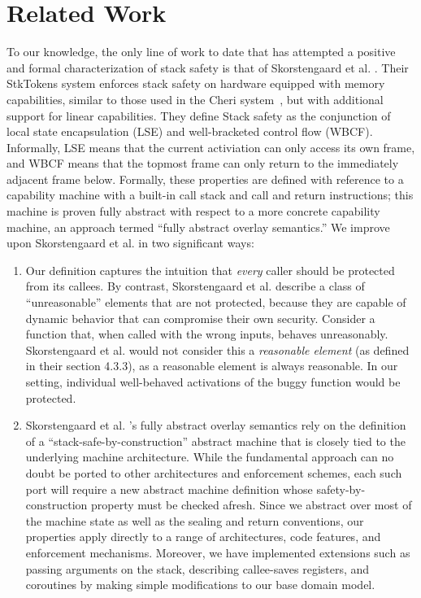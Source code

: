 \documentclass[10pt,conference]{ieeetran}%
\theoremstyle{definition}
\begin{document}
{\section{Related Work}
\label{sec:relwork}

%
To our knowledge, the only line of work to date that has attempted
a positive and formal characterization of stack safety
is that of Skorstengaard et al. \cite{SkorstengaardSTKJFP}. Their
StkTokens system enforces stack safety on hardware equipped with
memory capabilities, similar to those used in the Cheri system~\cite{Woodruff+14,Chisnall+15}, but
with additional support for linear capabilities.
They define Stack safety as the conjunction of local state encapsulation (LSE) and
well-bracketed control flow (WBCF).
Informally, LSE means that the current activiation can only access its own frame,
and WBCF means that the topmost frame can only return to
the immediately adjacent frame below. Formally, these properties are defined
with reference to a capability machine with a built-in call stack and call and return
instructions; this machine is proven fully abstract with respect to a more
concrete capability machine, an approach termed ``fully abstract overlay semantics.''
We improve upon Skorstengaard et al. \cite{SkorstengaardSTKJFP} in two significant ways:
\begin{enumerate}[label=(\roman*)]
\item Our definition captures the intuition that {\em
  every} caller should be protected from its callees.  By contrast,
  Skorstengaard et al. \cite{SkorstengaardSTKJFP} describe a class of ``unreasonable'' elements
  that are not protected, because they are capable of dynamic behavior that can compromise
  their own security. Consider a function that, when called with the wrong
  inputs, behaves unreasonably. Skorstengaard et al. \cite{SkorstengaardSTKJFP} would not consider this a
  {\em reasonable element} (as defined in their section 4.3.3), as a reasonable
  element is always reasonable. In our setting, individual
  well-behaved activations of the buggy function would be protected.

\item Skorstengaard et al. \cite{SkorstengaardSTKJFP}'s fully
  abstract overlay
  semantics rely on the definition of a ``stack-safe-by-construction''
  abstract machine that is closely tied to the underlying machine architecture.
  While the fundamental approach can no doubt be ported to other architectures and enforcement
  schemes, each such port will require a new abstract machine definition whose
  safety-by-construction property must be checked afresh.
  Since we abstract over most of the machine
  state as well as the sealing and return conventions, our properties apply directly
  to a range of architectures, code features, and enforcement mechanisms.
  Moreover, we have implemented extensions such as passing arguments on the stack,
  describing callee-saves registers, and coroutines by making simple modifications
  to our base domain model.


\end{enumerate}}
\end{document}
